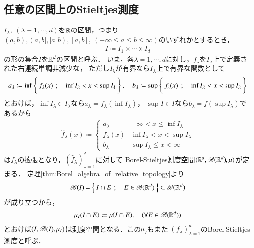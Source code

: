 \subsection{任意の区間上のStieltjes測度}
	$I_\lambda,\ (\lambda=1,\cdots,d)$を$\mathbb{R}$の区間，つまり
	$(a,b),(a,b],[a,b),[a,b],\ (-\infty \leq a \leq b \leq \infty)$のいずれかとするとき，
	\begin{align}
		I \coloneqq I_1 \times \cdots \times I_d
	\end{align}
	の形の集合$I$を$\mathbb{R}^d$の区間と呼ぶ．
	いま，各$\lambda=1,\cdots,d$に対し，$f_\lambda$を$I_\lambda$上で定義された右連続単調非減少な，
	ただし$I_\lambda$が有界なら$I_\lambda$上で有界な関数として
	\begin{align}
		a_\lambda \coloneqq \operatorname*{inf}_{} \left\{\ f_\lambda(x)\ \, ; \quad \operatorname*{inf}_{} I_\lambda < x < \operatorname*{sup}_{} I_\lambda\ \right\},
		\quad b_\lambda \coloneqq \operatorname*{sup}_{} \left\{\ f_\lambda(x)\ \, ; \quad \operatorname*{inf}_{} I_\lambda < x < \operatorname*{sup}_{} I_\lambda\ \right\}
	\end{align}
	とおけば，$\inf{}{I_\lambda} \in I_\lambda$なら$a_\lambda = f_\lambda(\inf{}{I_\lambda})$，
	$\sup{}{I} \in I$なら$b_\lambda = f(\sup{}{I_\lambda})$であるから
	\begin{align}
		\hat{f}_\lambda(x) \coloneqq 
		\begin{cases}
			a_\lambda & -\infty < x \leq \inf{}{I_\lambda} \\
			f_\lambda(x) & \inf{}{I_\lambda} < x < \sup{}{I_\lambda} \\
			b_\lambda & \sup{}{I_\lambda} \leq x < \infty
		\end{cases}
	\end{align}
	は$f_\lambda$の拡張となり，$\left( \hat{f}_\lambda \right)_{\lambda=1}^d$に対して
	Borel-Stieltjes測度空間$(\mathbb{R}^d,\mathscr{B}(\mathbb{R}^d),\mu)$が定まる．
	定理\ref{thm:Borel_algebra_of_relative_topology}より
	\begin{align}
		\mathscr{B}(I) = \left\{\ I \cap E\ \, ; \quad E \in \mathscr{B}(\mathbb{R}^d)\ \right\} \subset \mathscr{B}(\mathbb{R}^d)
	\end{align}
	が成り立つから，
	\begin{align}
		\mu_I(I \cap E) \coloneqq \mu(I \cap E),
		\quad (\forall E \in \mathscr{B}(\mathbb{R}^d))
	\end{align}
	とおけば$(I,\mathscr{B}(I),\mu_I)$は測度空間となる．この$\mu_I$もまた
	$(f_\lambda)_{\lambda=1}^d$のBorel-Stieltjes測度と呼ぶ．
	
